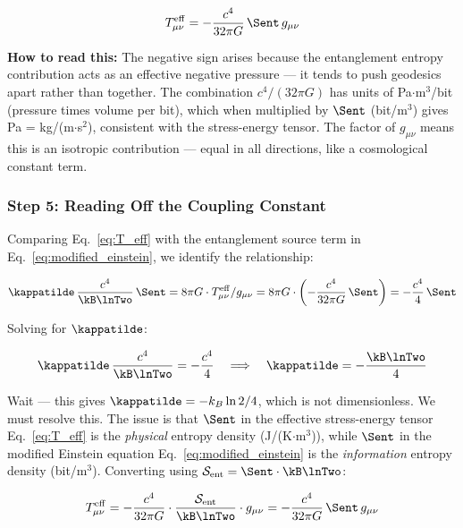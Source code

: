 \begin{equation}
    T^{\mathrm{eff}}_{\mu\nu} = -\frac{c^4}{32\pi G}\,\Sent\,g_{\mu\nu}
    \label{eq:T_eff}
\end{equation}

\noindent \textbf{How to read this:} The negative sign arises because the
entanglement entropy contribution acts as an effective negative pressure ---
it tends to push geodesics apart rather than together. The combination
$c^4/(32\pi G)$ has units of Pa$\cdot$m$^3$/bit (pressure times volume per
bit), which when multiplied by $\Sent$ (bit/m$^3$) gives Pa = kg/(m$\cdot$s$^2$),
consistent with the stress-energy tensor. The factor of $g_{\mu\nu}$
means this is an isotropic contribution --- equal in all directions, like
a cosmological constant term.

\subsubsection{Step 5: Reading Off the Coupling Constant}

Comparing Eq.~\eqref{eq:T_eff} with the entanglement source term in
Eq.~\eqref{eq:modified_einstein}, we identify the relationship:

\begin{equation}
    \kappatilde\,\frac{c^4}{\kB\lnTwo}\,\Sent
    = 8\pi G \cdot T^{\mathrm{eff}}_{\mu\nu}/g_{\mu\nu}
    = 8\pi G \cdot \left(-\frac{c^4}{32\pi G}\,\Sent\right)
    = -\frac{c^4}{4}\,\Sent
    \label{eq:kappa_comparison}
\end{equation}

Solving for $\kappatilde$:

\begin{equation}
    \kappatilde\,\frac{c^4}{\kB\lnTwo} = -\frac{c^4}{4}
    \quad \Longrightarrow \quad
    \kappatilde = -\frac{\kB\lnTwo}{4}
    \label{eq:kappa_intermediate}
\end{equation}

Wait --- this gives $\kappatilde = -k_B\ln2/4$, which is not dimensionless.
We must resolve this. The issue is that $\Sent$ in the effective stress-energy
tensor Eq.~\eqref{eq:T_eff} is the \emph{physical} entropy density
(J/(K$\cdot$m$^3$)), while $\Sent$ in the modified Einstein equation
Eq.~\eqref{eq:modified_einstein} is the \emph{information} entropy density
(bit/m$^3$). Converting using
$\mathcal{S}_{\mathrm{ent}} = \Sent\cdot\kB\lnTwo$:

\begin{equation}
    T^{\mathrm{eff}}_{\mu\nu} = -\frac{c^4}{32\pi G}
    \cdot\frac{\mathcal{S}_{\mathrm{ent}}}{\kB\lnTwo}\cdot g_{\mu\nu}
    = -\frac{c^4}{32\pi G}\,\Sent\,g_{\mu\nu}
\end{equation}

